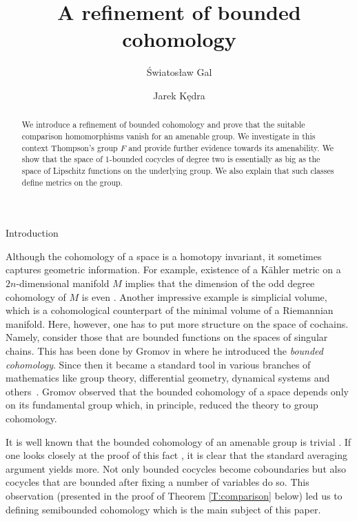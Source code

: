 \documentclass[12pt,reqno,a4paper]{amsart}
\author@andify\authors
\makeatletter
\def\section{\@startsection{section}{1}%
  \z@{.7\linespacing\@plus\linespacing}{.5\linespacing}%
  {\normalfont\bfseries\raggedright\boldmath}}
\theoremstyle{definition}
\theoremstyle{remark}
\numberwithin{equation}{section}
\numberwithin{figure}{section}
\makeatother
\begin{document}
\title{A refinement of bounded cohomology}
\author{Światosław Gal}
\author{Jarek Kędra}



\begin{abstract}
We introduce a refinement of bounded cohomology and prove that the suitable
comparison homomorphisms vanish for an amenable group.
We investigate in this context Thompson's group
$F$ and provide further evidence towards its amenability.
We show that the space
of 1-bounded cocycles of degree two is essentially as big as the space of
Lipschitz functions on the underlying group.  We also explain that such classes
define metrics on the group.  
\end{abstract}

\maketitle

\section{Introduction}\label{S:intro}

Although the cohomology of a space is a homotopy invariant, it sometimes
captures geometric information. For example, existence of a K\"ahler metric on
a $2n$-dimensional manifold $M$ implies that the dimension of the odd degree
cohomology of $M$ is even \cite{zbMATH03634395}. Another impressive example is
simplicial volume, which is a cohomological counterpart of the minimal volume
of a Riemannian manifold. Here, however, one has to put more structure on the
space of cochains.  Namely, consider those that are bounded functions on the
spaces of singular chains. This has been done by Gromov in
\cite{zbMATH03816552} where he introduced the {\em bounded cohomology}. Since
then it became a standard tool in various branches of mathematics like group
theory, differential geometry, dynamical systems and
others~\cite{zbMATH01614276}. Gromov observed that the bounded cohomology of a
space depends only on its fundamental group which, in principle, reduced the
theory to group cohomology. 

It is well known that the bounded cohomology of an amenable group is trivial
\cite[Section 3]{zbMATH03816552}. If one looks closely at the proof of this
fact \cite{zbMATH06821283,zbMATH05304367}, it is clear that the standard
averaging argument yields more. Not only bounded cocycles become coboundaries
but also cocycles that are bounded after fixing a number of variables do so.
This observation (presented in the proof of Theorem \ref{T:comparison} below)
led us to defining semibounded cohomology which is the main subject of this
paper. 
\end{document}
